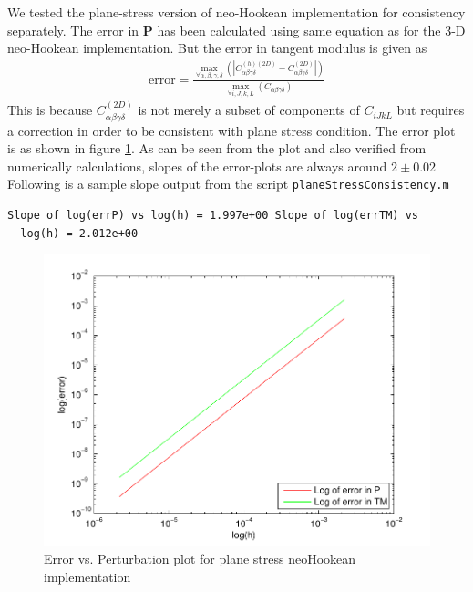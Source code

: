 \message{ !name(p1_2.tex)}\documentclass[../main.tex]{subfiles}
\begin{document}
We tested the plane-stress version of neo-Hookean implementation for
consistency separately. The error in $\mathbf{P}$ has been calculated
using same equation as for the 3-D neo-Hookean implementation. But the
error in tangent modulus is given as
\begin{align*}
  \text{error} =\frac{\underset{\forall \alpha,\beta,\gamma,\delta}{\max}\left(|C^{(h)(2D)}_{\alpha\beta\gamma\delta}-C^{(2D)}_{\alpha\beta\gamma\delta}|\right)}{\underset{\forall i,J,k,L}{\max}\left(C_{\alpha\beta\gamma\delta}\right)}
\end{align*}
This is because $C^{(2D)}_{\alpha\beta\gamma\delta}$ is not merely a
subset of components of $C_{iJkL}$ but requires a correction in order
to be consistent with plane stress condition. The error plot is as
shown in figure \ref{fig:psneoHcon}. As can be seen from the plot and
also verified from numerically calculations, slopes of the error-plots
are always around $2\pm0.02$ Following is a sample slope output from
the script \texttt{planeStressConsistency.m}
\begin{lstlisting}[frame=single]
  Slope of log(errP) vs log(h) = 1.997e+00 Slope of log(errTM) vs
  log(h) = 2.012e+00
\end{lstlisting}
\begin{figure}[h]
  \centering
  \includegraphics{./img/planeStressConsistency.pdf}
  \caption{Error vs. Perturbation plot for plane stress neoHookean
    implementation}
  \label{fig:psneoHcon}
\end{figure}
\end{document}
